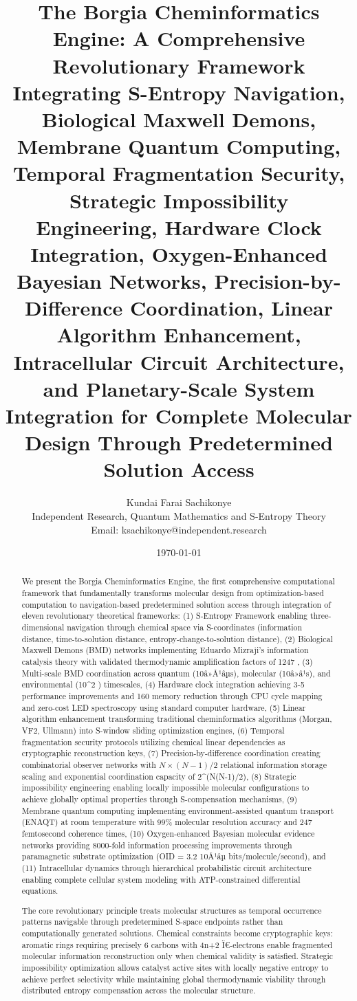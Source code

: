 ﻿\documentclass[11pt,a4paper]{article}
\title{The Borgia Cheminformatics Engine: A Comprehensive Revolutionary Framework Integrating S-Entropy Navigation, Biological Maxwell Demons, Membrane Quantum Computing, Temporal Fragmentation Security, Strategic Impossibility Engineering, Hardware Clock Integration, Oxygen-Enhanced Bayesian Networks, Precision-by-Difference Coordination, Linear Algorithm Enhancement, Intracellular Circuit Architecture, and Planetary-Scale System Integration for Complete Molecular Design Through Predetermined Solution Access}
\author{Kundai Farai Sachikonye\\
Independent Research, Quantum Mathematics and S-Entropy Theory\\
Email: ksachikonye@independent.research}
\date{\today}
\begin{document}
\maketitle

\begin{abstract}

We present the Borgia Cheminformatics Engine, the first comprehensive computational framework that fundamentally transforms molecular design from optimization-based computation to navigation-based predetermined solution access through integration of eleven revolutionary theoretical frameworks: (1) S-Entropy Framework enabling three-dimensional navigation through chemical space via S-coordinates (information distance, time-to-solution distance, entropy-change-to-solution distance), (2) Biological Maxwell Demons (BMD) networks implementing Eduardo Mizraji's information catalysis theory with validated thermodynamic amplification factors of 1247  \times, (3) Multi-scale BMD coordination across quantum (10â»Â¹âµs), molecular (10â»â¹s), and environmental (10^{2} ) timescales, (4) Hardware clock integration achieving 3-5 \times performance improvements and 160 \times memory reduction through CPU cycle mapping and zero-cost LED spectroscopy using standard computer hardware, (5) Linear algorithm enhancement transforming traditional cheminformatics algorithms (Morgan, VF2, Ullmann) into S-window sliding optimization engines, (6) Temporal fragmentation security protocols utilizing chemical linear dependencies as cryptographic reconstruction keys, (7) Precision-by-difference coordination creating combinatorial observer networks with $N \times (N-1)/2$ relational information storage scaling and exponential coordination capacity of 2^(N(N-1)/2), (8) Strategic impossibility engineering enabling locally impossible molecular configurations to achieve globally optimal properties through S-compensation mechanisms, (9) Membrane quantum computing implementing environment-assisted quantum transport (ENAQT) at room temperature with 99\% molecular resolution accuracy and 247  femtosecond coherence times, (10) Oxygen-enhanced Bayesian molecular evidence networks providing 8000-fold information processing improvements through paramagnetic substrate optimization (OID = 3.2 \times10Â¹âµ bits/molecule/second), and (11) Intracellular dynamics through hierarchical probabilistic circuit architecture enabling complete cellular system modeling with ATP-constrained differential equations.

The core revolutionary principle treats molecular structures as temporal occurrence patterns navigable through predetermined S-space endpoints rather than computationally generated solutions. Chemical constraints become cryptographic keys: aromatic rings requiring precisely 6 carbons with 4n+2 Ï€-electrons enable fragmented molecular information reconstruction only when chemical validity is satisfied. Strategic impossibility optimization allows catalyst active sites with locally negative entropy to achieve perfect selectivity while maintaining global thermodynamic viability through distributed entropy compensation across the molecular structure.


\end{abstract}
\end{document}
